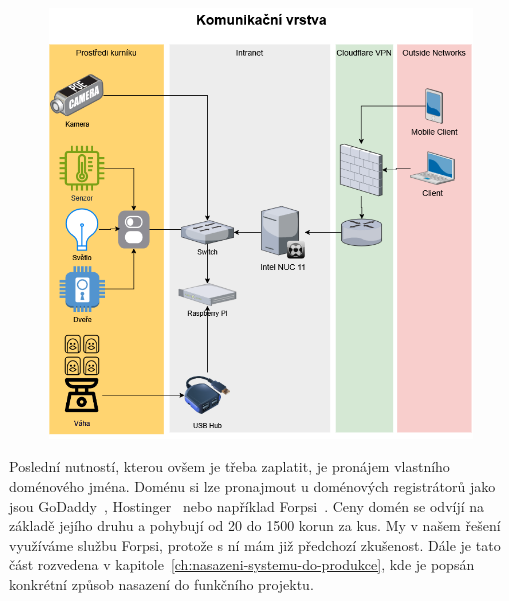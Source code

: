 \begin{figure}[H]
    \centering
    \includegraphics[width=\textwidth]{img/orientacni_topologie}
    \label{fig:orientacni_topologie}
\end{figure}

Poslední nutností, kterou ovšem je třeba zaplatit, je pronájem vlastního doménového jména.
Doménu si lze pronajmout u doménových registrátorů jako jsou GoDaddy~\cite{GoDaddy}, Hostinger~\cite{Hostinger} nebo například Forpsi~\cite{forpsi}.
Ceny domén se odvíjí na základě jejího druhu a pohybují od 20 do 1500 korun za kus.
My v našem řešení využíváme službu Forpsi, protože s ní mám již předchozí zkušenost.\newline
Dále je tato část rozvedena v kapitole~\ref{ch:nasazeni-systemu-do-produkce}, kde je popsán konkrétní způsob nasazení do funkčního projektu.



